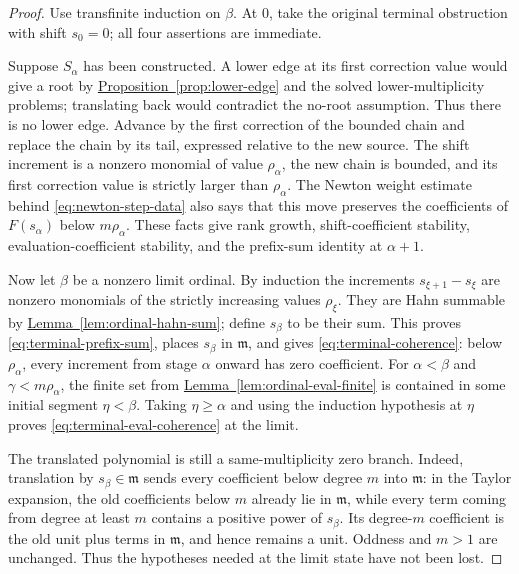 \documentclass[11pt]{article}
\newcommand{\namedref}[2]{\hyperref[#2]{#1~\ref*{#2}}}
\theoremstyle{proofnote}
\begin{document}
\begin{proof}
  Use transfinite induction on \(\beta\).  At \(0\), take the original
  terminal obstruction with shift \(s_0=0\); all four assertions are
  immediate.

  Suppose \(S_\alpha\) has been constructed.  A lower edge at its first
  correction value would give a root by
  \namedref{Proposition}{prop:lower-edge} and the solved lower-multiplicity
  problems; translating back would contradict the no-root assumption.
  Thus there is no lower edge.  Advance by the first correction of the
  bounded chain and replace the chain by its tail, expressed relative to
  the new source.  The shift increment is a nonzero monomial of
  value \(\rho_\alpha\), the new chain is bounded, and its first correction
  value is strictly larger than \(\rho_\alpha\).  The Newton weight estimate
  behind \eqref{eq:newton-step-data} also says that this move preserves the
  coefficients of \(F(s_\alpha)\) below \(m\rho_\alpha\).  These facts give
  rank growth, shift-coefficient stability, evaluation-coefficient stability,
  and the prefix-sum identity at \(\alpha+1\).

  Now let \(\beta\) be a nonzero limit ordinal.  By induction the increments
  \(s_{\xi+1}-s_\xi\) are nonzero monomials of the strictly increasing values
  \(\rho_\xi\).  They are Hahn summable by
  \namedref{Lemma}{lem:ordinal-hahn-sum}; define \(s_\beta\) to be their sum.
  This proves \eqref{eq:terminal-prefix-sum}, places \(s_\beta\) in
  \(\mathfrak m\), and gives \eqref{eq:terminal-coherence}: below
  \(\rho_\alpha\), every increment from stage \(\alpha\) onward has zero
  coefficient.  For
  \(\alpha<\beta\) and \(\gamma<m\rho_\alpha\), the finite set from
  \namedref{Lemma}{lem:ordinal-eval-finite} is contained in some initial
  segment \(\eta<\beta\).  Taking \(\eta\ge\alpha\) and using the induction
  hypothesis at \(\eta\) proves
  \eqref{eq:terminal-eval-coherence} at the limit.

  The translated polynomial is still a same-multiplicity zero branch.
  Indeed, translation by \(s_\beta\in\mathfrak m\) sends every coefficient
  below degree \(m\) into \(\mathfrak m\): in the Taylor expansion, the old
  coefficients below \(m\) already lie in \(\mathfrak m\), while every term
  coming from degree at least \(m\) contains a positive power of
  \(s_\beta\).  Its degree-\(m\) coefficient is the old unit plus terms in
  \(\mathfrak m\), and hence remains a unit.  Oddness and \(m>1\) are
  unchanged.  Thus the hypotheses needed at the limit state have not been
  lost.


\end{proof}
\end{document}
